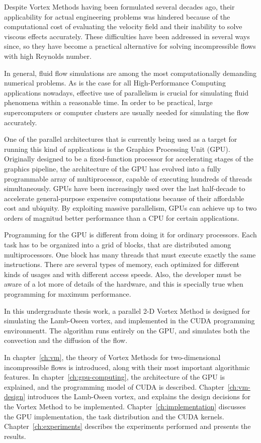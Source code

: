 Despite Vortex Methods having been formulated several decades ago,
their applicability for actual engineering problems was hindered
because of the computational cost of evaluating the velocity field
and their inability to solve viscous effects accurately.
These difficulties have been addressed in several ways since,
so they have become a practical alternative
for solving incompressible flows with high Reynolds number.

In general,
fluid flow simulations are among
the most computationally demanding numerical problems.
As is the case
for all High-Performance Computing applications nowadays,
effective use of parallelism is crucial for
simulating fluid phenomena within a reasonable time.
In order to be practical,
large supercomputers or computer clusters
are usually needed for simulating the flow accurately.

One of the parallel architectures
that is currently being used as a target
for running this kind of applications
is the Graphics Processing Unit (GPU).
Originally designed to be a fixed-function processor
for accelerating stages of the graphics pipeline,
the architecture of the GPU has evolved
into a fully programmable array of multiprocessor,
capable of executing hundreds of threads simultaneously.
GPUs have been increasingly used over the last half-decade
to accelerate general-purpose expensive computations
because of their affordable cost and ubiquity.
By exploiting massive parallelism,
GPUs can achieve up to two orders of magnitud
better performance than a CPU
for certain applications.

Programming for the GPU is different from doing it
for ordinary processors.
Each task has to be organized into a grid of blocks,
that are distributed among multiprocessors.
One block has many threads that must execute
exactly the same instructions.
There are several types of memory,
each optimized for different kinds of usages
and with different access speeds.
Also, the developer must be aware of
a lot more of details of the hardware,
and this is specially true
when programming for maximum performance.

In this undergraduate thesis work,
a parallel 2-D Vortex Method is designed
for simulating the Lamb-Oseen vortex,
and implemented in the CUDA programming environmentt.
The algorithm runs entirely on the GPU,
and simulates both the convection and the diffusion of the flow.

In chapter~\ref{ch:vm},
the theory of Vortex Methods for two-dimensional
incompressible flows is introduced,
along with their most important algorithmic features.
In chapter~\ref{ch:gpu-computing},
the architecture of the GPU is explained,
and the programming model
of CUDA is described.
Chapter~\ref{ch:vm-design}
introduces the Lamb-Oseen vortex,
and explains the design decisions
for the Vortex Method to be implemented.
Chapter~\ref{ch:implementation}
discusses the GPU implementation,
the task distribution and the CUDA kernels.
Chapter~\ref{ch:experiments}
describes the experiments performed
and presents the results.

